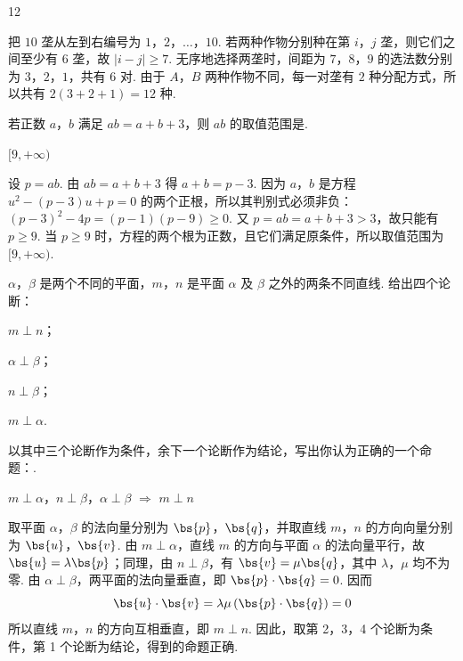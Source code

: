 \documentclass[UTF8,a4paper,oneside,11pt]{ctexbook}
\begin{document}
\begin{answer}
12
\end{answer}

\begin{solution}
把 \(10\) 垄从左到右编号为 \(1\)，\(2\)，\(\ldots\)，\(10\). 若两种作物分别种在第 \(i\)，\(j\) 垄，则它们之间至少有 \(6\) 垄，故 \(|i-j|\geqslant7\).
无序地选择两垄时，间距为 \(7\)，\(8\)，\(9\) 的选法数分别为 \(3\)，\(2\)，\(1\)，共有 \(6\) 对. 由于 \(A\)，\(B\) 两种作物不同，每一对垄有 \(2\) 种分配方式，所以共有 \(2(3+2+1)=12\) 种.
\end{solution}

\begin{problem}
若正数 \(a\)，\(b\) 满足 \(ab = a + b + 3\)，则 \(ab\) 的取值范围是\fillinblank{}.
\end{problem}

\begin{answer}
\([9,+\infty)\)
\end{answer}

\begin{solution}
设 \(p=ab\). 由 \(ab=a+b+3\) 得 \(a+b=p-3\). 因为 \(a\)，\(b\) 是方程
\(u^2-(p-3)u+p=0\) 的两个正根，所以其判别式必须非负：
\((p-3)^2-4p=(p-1)(p-9)\geqslant0\).
又 \(p=ab=a+b+3>3\)，故只能有 \(p\geqslant9\).
当 \(p\geqslant9\) 时，方程的两个根为正数，且它们满足原条件，所以取值范围为 \([9,+\infty)\).
\end{solution}

\begin{problem}
\(\alpha\)，\(\beta\) 是两个不同的平面，\(m\)，\(n\) 是平面 \(\alpha\) 及 \(\beta\) 之外的两条不同直线. 给出四个论断：

\begin{circlelist}
\item \(m\perp n\)；
\item \(\alpha\perp\beta\)；
\item \(n\perp\beta\)；
\item \(m\perp\alpha\).
\end{circlelist}

以其中三个论断作为条件，余下一个论断作为结论，写出你认为正确的一个命题：\fillinblank{}.
\end{problem}

\begin{answer}
\(m\perp\alpha\)，\(n\perp\beta\)，\(\alpha\perp\beta\) \(\Longrightarrow\) \(m\perp n\)
\end{answer}

\begin{solution}
取平面 \(\alpha\)，\(\beta\) 的法向量分别为 \(\bs{p}\)，\(\bs{q}\)，并取直线 \(m\)，\(n\) 的方向向量分别为 \(\bs{u}\)，\(\bs{v}\). 由 \(m\perp\alpha\)，直线 \(m\) 的方向与平面 \(\alpha\) 的法向量平行，故 \(\bs{u}=\lambda\bs{p}\)；同理，由 \(n\perp\beta\)，有 \(\bs{v}=\mu\bs{q}\)，其中 \(\lambda\)，\(\mu\) 均不为零. 由 \(\alpha\perp\beta\)，两平面的法向量垂直，即 \(\bs{p}\cdot\bs{q}=0\). 因而
\[
\bs{u}\cdot\bs{v}=\lambda\mu\left(\bs{p}\cdot\bs{q}\right)=0
\]
所以直线 \(m\)，\(n\) 的方向互相垂直，即 \(m\perp n\). 因此，取第 2，3，4 个论断为条件，第 1 个论断为结论，得到的命题正确.
\end{solution}
\end{document}
